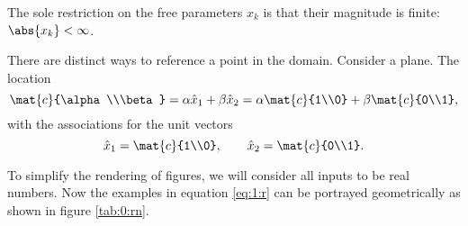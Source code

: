 The sole restriction on the free parameters $x_{k}$ is that their magnitude is finite: $\abs{x_{k}}<\infty$.

There are distinct ways to reference a point in the domain. Consider a plane. The location 
\begin{equation}
  \mat{c}{\alpha\\\beta} = \alpha \hat{x}_{1} + \beta \hat{x}_{2}  = \alpha \mat{c}{1\\0} + \beta \mat{c}{0\\1},
\end{equation}
with the associations for the unit vectors
\begin{equation}
  \hat{x}_{1} = \mat{c}{1\\0}, \qquad \hat{x}_{2} = \mat{c}{0\\1}.
\end{equation}

To simplify the rendering of figures, we will consider all inputs to be real numbers. Now the examples in equation \eqref{eq:1:r} can be portrayed geometrically as shown in figure \eqref{tab:0:rn}.
\begin{table}[htdp]
\begin{center}
\end{center}
\caption[Domains of increasing dimension, $\real{n}$]{Domains of increasing dimension, $\real{n}$. Here we see representations for a point in $\real{1}$, a line; $\real{2}$, a plane and $\real{3}$, a volume. The axes are mutually orthogonal. Each point in the domain is represented by a $n-$vector $x_{k},\ k=1,n$ which defines a distance from the origin.}
\label{tab:0:rn}
\end{table}%

